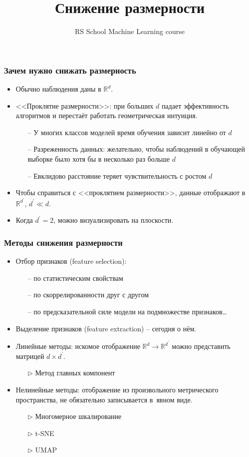 \documentclass[unicode]{beamer}
\title[Снижение размерности]{Снижение размерности}
\author[]{RS School Machine Learning course}
\institute[]{}
\date[]{}
\begin{document}
\begin{frame}
  \titlepage
\end{frame}

\begin{frame}[t]
\frametitle{Зачем нужно снижать размерность}
\begin{itemize}
\item Обычно наблюдения даны в $\mathbb{R}^d$.
\item {<<}Проклятие размерности>>: при больших $d$ падает эффективность алгоритмов и перестаёт работать геометрическая интуиция.
  \begin{itemize}
  \item[--] У многих классов моделей время обучения зависит линейно от $d$
  \item[--] Разреженность данных: желательно, чтобы наблюдений в обучающей выборке было хотя бы в несколько раз больше $d$
  \item[--] Евклидово расстояние теряет чувствительность с ростом $d$
  \end{itemize}
\item Чтобы справиться с <<проклятием размерности>>, данные отображают в $\mathbb{R}^{d^\prime}$, $d^\prime \ll d$.
\item Когда $d^\prime = 2$, можно визуализировать на плоскости.
\end{itemize}
\end{frame}

\begin{frame}[t]
\frametitle{Методы снижения размерности}
\begin{itemize}
\item Отбор признаков (feature selection):
  \begin{itemize}
  \item[--] по статистическим свойствам
  \item[--] по скоррелированности друг с другом
  \item[--] по предсказательной силе модели на подмножестве признаков\dots
  \end{itemize}
\item Выделение признаков (feature extraction) -- сегодня о нём.
\item Линейные методы: искомое отображение $\mathbb{R}^d \rightarrow \mathbb{R}^{d^\prime}$ можно представить матрицей $d \times d^\prime$.
  \begin{itemize}
  \item[$\rhd$] Метод главных компонент
  \end{itemize}
\item Нелинейные методы: отображение из произвольного метрического пространства, не обязательно записывается в~явном виде.
  \begin{itemize}
  \item[$\rhd$] Многомерное шкалирование
  \item[$\rhd$] t-SNE
  \item[$\rhd$] UMAP
  \end{itemize}
\end{itemize}
\end{frame}
\end{document}
